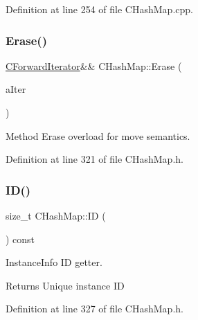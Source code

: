 Definition at line 254 of file C\+Hash\+Map.\+cpp.

\mbox{\label{class_c_hash_map_a82b22ccd322c826a368101e6451c5153}} 
\subsubsection{\texorpdfstring{Erase()}{Erase()}\hspace{0.1cm}{\footnotesize\ttfamily [2/2]}}
{\footnotesize\ttfamily \hyperlink{class_c_hash_map_1_1_c_forward_iterator}{C\+Forward\+Iterator}\&\& C\+Hash\+Map\+::\+Erase (\begin{DoxyParamCaption}\item[{\hyperlink{class_c_hash_map_1_1_c_forward_iterator}{C\+Forward\+Iterator} \&\&}]{a\+Iter }\end{DoxyParamCaption})\hspace{0.3cm}{\ttfamily [inline]}}



Method Erase overload for move semantics. 



Definition at line 321 of file C\+Hash\+Map.\+h.

\mbox{\label{class_c_hash_map_a9db788f13512583b22ed7b75fd76a9de}} 
\subsubsection{\texorpdfstring{I\+D()}{ID()}}
{\footnotesize\ttfamily size\+\_\+t C\+Hash\+Map\+::\+ID (\begin{DoxyParamCaption}{ }\end{DoxyParamCaption}) const\hspace{0.3cm}{\ttfamily [inline]}}



Instance\+Info ID getter. 

\begin{DoxyReturn}{Returns}
Unique instance ID 
\end{DoxyReturn}


Definition at line 327 of file C\+Hash\+Map.\+h.

\mbox{\label{class_c_hash_map_a443526f71277f329e9e77522c31f1350}} 
